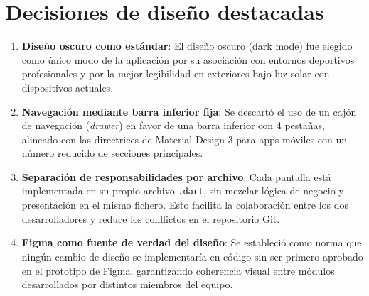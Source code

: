 \section{Decisiones de diseño destacadas}

\begin{enumerate}
  \item \textbf{Diseño oscuro como estándar}: El diseño oscuro (dark mode) fue elegido como único modo de la aplicación por su asociación con entornos deportivos profesionales y por la mejor legibilidad en exteriores bajo luz solar con dispositivos actuales.

  \item \textbf{Navegación mediante barra inferior fija}: Se descartó el uso de un cajón de navegación (\textit{drawer}) en favor de una barra inferior con 4 pestañas, alineado con las directrices de Material Design 3 para apps móviles con un número reducido de secciones principales.

  \item \textbf{Separación de responsabilidades por archivo}: Cada pantalla está implementada en su propio archivo \texttt{.dart}, sin mezclar lógica de negocio y presentación en el mismo fichero. Esto facilita la colaboración entre los dos desarrolladores y reduce los conflictos en el repositorio Git.

  \item \textbf{Figma como fuente de verdad del diseño}: Se estableció como norma que ningún cambio de diseño se implementaría en código sin ser primero aprobado en el prototipo de Figma, garantizando coherencia visual entre módulos desarrollados por distintos miembros del equipo.
\end{enumerate}
